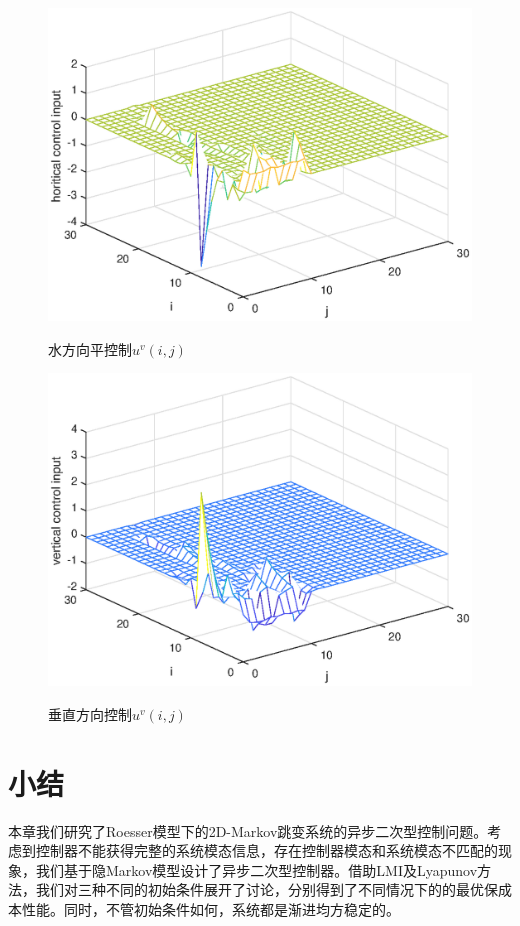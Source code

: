 	\begin{figure}[!htb]
		\centering\includegraphics[scale=0.6]{./figures/qc/simulation/hU.eps}\\ 
		\caption{水方向平控制$u^{v}(i,j)$}
		\label{figqcuh}
	\end{figure}
	
	\begin{figure}[!htb]
		\centering\includegraphics[scale=0.6]{./figures/qc/simulation/vH.eps}\\ 
		\caption{垂直方向控制$u^{v}(i,j)$}
		\label{figqcuv}
	\end{figure}

\section{小结} \label{conclusion} 	
	本章我们研究了Roesser模型下的2D-Markov跳变系统的异步二次型控制问题。考虑到控制器不能获得完整的系统模态信息，存在控制器模态和系统模态不匹配的现象，我们基于隐Markov模型设计了异步二次型控制器。借助LMI及Lyapunov方法，我们对三种不同的初始条件展开了讨论，分别得到了不同情况下的的最优保成本性能。同时，不管初始条件如何，系统都是渐进均方稳定的。
	
	
